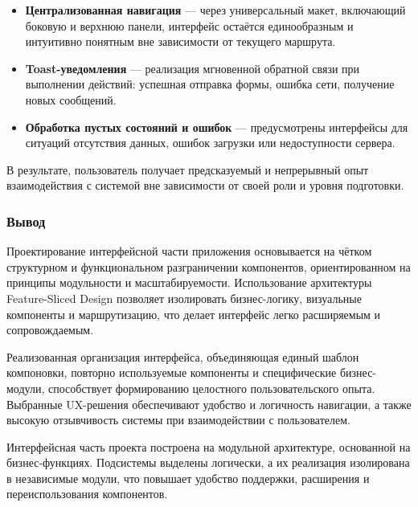 \begin{itemize}
  \item \textbf{Централизованная навигация} — через универсальный макет, включающий боковую и верхнюю панели, интерфейс остаётся единообразным и интуитивно понятным вне зависимости от текущего маршрута.
  \item \textbf{Toast-уведомления} — реализация мгновенной обратной связи при выполнении действий: успешная отправка формы, ошибка сети, получение новых сообщений.
  \item \textbf{Обработка пустых состояний и ошибок} — предусмотрены интерфейсы для ситуаций отсутствия данных, ошибок загрузки или недоступности сервера.
 \end{itemize}

В результате, пользователь получает предсказуемый и непрерывный опыт взаимодействия с системой вне зависимости от своей роли и уровня подготовки.

\subsubsection{Вывод}

Проектирование интерфейсной части приложения основывается на чётком структурном и функциональном разграничении компонентов, ориентированном на принципы модульности и масштабируемости. Использование архитектуры Feature-Sliced Design позволяет изолировать бизнес-логику, визуальные компоненты и маршрутизацию, что делает интерфейс легко расширяемым и сопровождаемым.

Реализованная организация интерфейса, объединяющая единый шаблон компоновки, повторно используемые компоненты и специфические бизнес-модули, способствует формированию целостного пользовательского опыта. Выбранные UX-решения обеспечивают удобство и логичность навигации, а также высокую отзывчивость системы при взаимодействии с пользователем.


Интерфейсная часть проекта построена на модульной архитектуре, основанной на бизнес-функциях. Подсистемы выделены логически, а их реализация изолирована в независимые модули, что повышает удобство поддержки, расширения и переиспользования компонентов.
